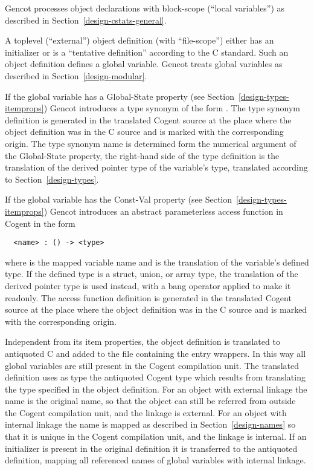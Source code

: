 Gencot processes object declarations with block-scope (``local variables'') as described in Section~\ref{design-cstats-general}. 

A toplevel (``external'') object definition (with ``file-scope'') either has an initializer or is a ``tentative definition''
according to the C standard. Such an object definition defines a global variable. Gencot treats global variables
as described in Section~\ref{design-modular}.

If the global variable has a Global-State property (see Section~\ref{design-types-itemprops}) Gencot introduces a type 
synonym of the form . The type synonym definition is generated in the translated Cogent source 
at the place where the object definition was in the C source and is marked with the corresponding origin. The 
type synonym name is determined form the numerical argument of the Global-State property, the right-hand side of
the type definition is the translation of the derived pointer type of the variable's type, translated according to
Section~\ref{design-types}.

If the global variable has the Const-Val property (see Section~\ref{design-types-itemprops}) Gencot introduces an abstract 
parameterless access function in Cogent in the form
\begin{verbatim}
  <name> : () -> <type>
\end{verbatim}
where  is the mapped variable name and  is the translation of the variable's defined type.
If the defined type is a struct, union, or array type, the translation of the derived pointer type is used instead,
with a bang operator applied to make it readonly. The access function definition is generated in the translated Cogent source 
at the place where the object definition was in the C source and is marked with the corresponding origin.

Independent from its item properties, the object definition is translated to antiquoted C and added to the file 
containing the entry wrappers. In this way all global variables are still present in the Cogent compilation unit.
The translated definition uses as type the antiquoted Cogent type which results from translating the type specified 
in the object definition. For an object with external linkage the name is the original name, so that the object can still
be referred from outside the Cogent compilation unit, and the linkage is external. For an object with internal linkage
the name is mapped as described in Section~\ref{design-names} so that it is unique in the Cogent compilation unit, and
the linkage is internal. If an initializer is present in the original definition it is transferred to the antiquoted
definition, mapping all referenced names of global variables with internal linkage.

